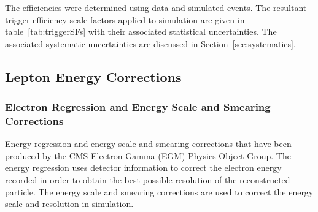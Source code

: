 The efficiencies were determined using data and simulated \ttbar events.
The resultant trigger efficiency scale factors applied to simulation are given in table~\ref{tab:triggerSFs} with their associated statistical uncertainties.
The associated systematic uncertainties are discussed in Section~\ref{sec:systematics}.

\begin{table}[htbp]
\label{tab:triggerSFs}
  \centering
\end{table}



\subsection{Lepton Energy Corrections}\label{subsec:leptonEnergyCorrections}
\subsubsection{Electron Regression and Energy Scale and Smearing Corrections}
Energy regression and energy scale and smearing corrections that have been produced by the CMS Electron Gamma (EGM) Physics Object Group.
The energy regression uses detector information to correct the electron energy recorded in order to obtain the best possible resolution of the reconstructed particle.
The energy scale and smearing corrections are used to correct the energy scale and resolution in simulation.

